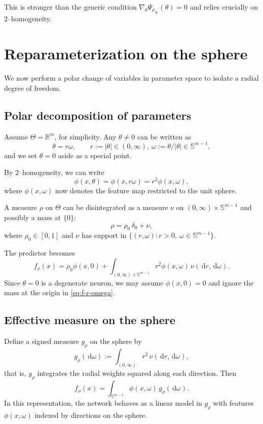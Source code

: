 \documentclass[11pt]{article}
\numberwithin{equation}{section}
\theoremstyle{definition}
\newcommand{\R}{\mathbb{R}}
\newcommand{\dd}{\,\mathrm{d}}
\newcommand{\1}{\mathbbm{1}}
\begin{document}
This is stronger than the generic condition $\nabla_\theta \Psi_{\rho_\infty}(\theta)=0$ and relies crucially on $2$--homogeneity.

\section{Reparameterization on the sphere}

We now perform a polar change of variables in parameter space to isolate a radial degree of freedom.

\subsection{Polar decomposition of parameters}

Assume $\Theta = \R^m$, for simplicity. Any $\theta\neq 0$ can be written as
\[
\theta = r\omega,
\qquad r:=|\theta|\in(0,\infty),\ \omega:=\theta/|\theta|\in\mathbb{S}^{m-1},
\]
and we set $\theta=0$ aside as a special point.

By $2$--homogeneity, we can write
\begin{equation}
\phi(x,\theta) = \phi(x,r\omega) = r^2\phi(x,\omega),
\end{equation}
where $\phi(x,\omega)$ now denotes the feature map restricted to the unit sphere.

A measure $\rho$ on $\Theta$ can be disintegrated as a measure $\nu$ on $(0,\infty)\times\mathbb{S}^{m-1}$ and possibly a mass at $\{0\}$:
\[
\rho = \rho_0\,\delta_0 + \nu,
\]
where $\rho_0\in[0,1]$ and $\nu$ has support in $\{(r,\omega):r>0,\ \omega\in\mathbb{S}^{m-1}\}$.

The predictor becomes
\begin{equation}
\label{eq:f-r-omega}
f_\rho(x)
= \rho_0\phi(x,0) + \int_{(0,\infty)\times\mathbb{S}^{m-1}} r^2\phi(x,\omega)\,\nu(\dd r,\dd\omega).
\end{equation}
Since $\theta=0$ is a degenerate neuron, we may assume $\phi(x,0)=0$ and ignore the mass at the origin in \eqref{eq:f-r-omega}.

\subsection{Effective measure on the sphere}

Define a signed measure $g_\rho$ on the sphere by
\begin{equation}
\label{eq:g-rho-def}
g_\rho(\dd\omega)
:= \int_{(0,\infty)} r^2\,\nu(\dd r,\dd\omega),
\end{equation}
that is, $g_\rho$ integrates the radial weights squared along each direction. Then
\begin{equation}
\label{eq:f-sphere}
f_\rho(x)
= \int_{\mathbb{S}^{m-1}} \phi(x,\omega)\,g_\rho(\dd\omega).
\end{equation}
In this representation, the network behaves as a linear model in $g_\rho$ with features $\phi(x,\omega)$ indexed by directions on the sphere.
\end{document}
